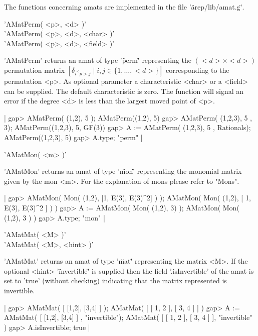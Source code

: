 The functions concerning amats are implemented in the file
'\"arep/lib/amat.g\"'.

'AMatPerm( <p>, <d> )'\\
'AMatPerm( <p>, <d>, <char> )'\\
'AMatPerm( <p>, <d>, <field> )'

'AMatPerm' returns an amat of type '\"perm\"' representing 
the $(<d>\times<d>)$ permutation matrix 
$[\delta_{i^<p>j}\mid i,j\in\{1,\dots,<d>\}]$ 
corresponding to the permutation <p>. As optional parameter 
a characteristic <char> or a <field> can be supplied. 
The default characteristic is zero. The function will signal 
an error if the degree <d> is less than the largest moved point of <p>.

|    gap> AMatPerm( (1,2), 5 );
    AMatPerm((1,2), 5)
    gap> AMatPerm( (1,2,3), 5 , 3);
    AMatPerm((1,2,3), 5, GF(3))
    gap> A := AMatPerm( (1,2,3), 5 , Rationals);
    AMatPerm((1,2,3), 5) 
    gap> A.type;
    "perm" |


'AMatMon( <m> )'

'AMatMon' returns an amat of type '\"mon\"' representing the
monomial matrix given by the mon <m>. For the explanation of mons
please refer to "Mons".

|    gap> AMatMon( Mon( (1,2), [1, E(3), E(3)^2] ) );
    AMatMon( Mon(
      (1,2),
      [ 1, E(3), E(3)^2 ]
    ) )
    gap> A := AMatMon( Mon( (1,2), 3) );
    AMatMon( Mon( (1,2), 3 ) )
    gap> A.type;
    "mon" |


'AMatMat( <M> )'\\
'AMatMat( <M>, <hint> )'

'AMatMat' returns an amat of type '\"mat\"' representing the
matrix <M>. If the optional <hint> '\"invertible\"' is supplied
then the field '.isInvertible' of the amat is set to 'true' (without
checking) indicating that the matrix represented is invertible.

|    gap> AMatMat( [ [1,2], [3,4] ] );
    AMatMat(
      [ [ 1, 2 ], [ 3, 4 ] ]
    ) 
    gap> A := AMatMat( [ [1,2], [3,4] ] , "invertible");    
    AMatMat(
      [ [ 1, 2 ], [ 3, 4 ] ],
      "invertible"
    )
    gap> A.isInvertible;
    true |

